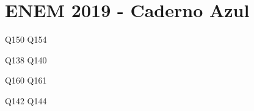\chapter{ENEM 2019 - Caderno Azul}

\setlength{\columnseprule}{0.5pt}
\setlength{\columnsep}{30pt}
\def\columnseprulecolor{\color{mygray}}
%
\begin{multicols}{2}
{Q150}
{Q154}

{Q138}
{Q140}

{Q160}
{Q161}

{Q142}
{Q144}

    
\end{multicols}



